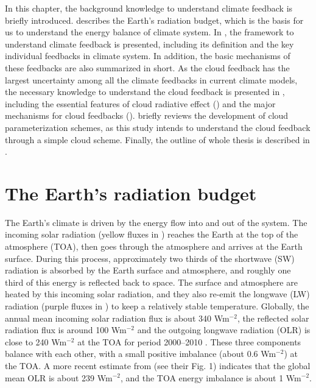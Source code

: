 In this chapter, the background knowledge to understand climate feedback is briefly introduced.  describes the Earth's radiation budget, which is the basis for us to understand the energy balance of climate system. In , the framework to understand climate feedback is presented, including its definition and the key individual feedbacks in climate system. In addition, the basic mechanisms of these feedbacks are also summarized in short. As the cloud feedback has the largest uncertainty among all the climate feedbacks in current climate models, the necessary knowledge to understand the cloud feedback is presented in , including the essential features of cloud radiative effect () and the major mechanisms for cloud feedbacks ().  briefly reviews the development of cloud parameterization schemes, as this study intends to understand the cloud feedback through a simple cloud scheme. Finally, the outline of whole thesis is described in .

\section{The Earth’s radiation budget}
\label{sec:earth_rad_budget}

The Earth's climate is driven by the energy flow into and out of the system. The incoming solar radiation (yellow fluxes in ) reaches the Earth at the top of the atmosphere (TOA), then goes through the atmosphere and arrives at the Earth surface. During this process, approximately two thirds of the shortwave (SW) radiation is absorbed by the Earth surface and atmosphere, and roughly one third of this energy is reflected back to space. The surface and atmosphere are heated by this incoming solar radiation, and they also re-emit the longwave (LW) radiation (purple fluxes in ) to keep a relatively stable temperature. Globally, the annual mean incoming solar radiation flux is about 340 Wm$^{-2}$, the reflected solar radiation flux is around 100 Wm$^{-2}$ and the outgoing longwave radiation (OLR) is close to 240 Wm$^{-2}$ at the TOA for period 2000--2010 \citep{Stephens2012update}. These three components balance with each other, with a small positive imbalance (about 0.6 Wm$^{-2}$) at the TOA. A more recent estimate from \cite{Wild2015} (see their Fig. 1) indicates that the global mean OLR is about 239 Wm$^{-2}$, and the TOA energy imbalance is about 1 Wm$^{-2}$.

